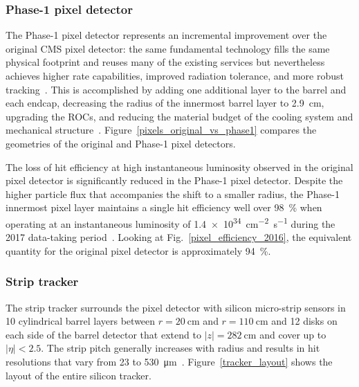 \subsubsection{Phase-1 pixel detector}
The Phase-1 pixel detector represents an incremental improvement over the original CMS pixel detector: the same fundamental technology fills the same physical footprint and reuses many of the existing services but nevertheless achieves higher rate capabilities, improved radiation tolerance, and more robust tracking~\cite{cms_phase1_pixels}. This is accomplished by adding one additional layer to the barrel and each endcap, decreasing the radius of the innermost barrel layer to \SI{2.9}{\cm}, upgrading the ROCs, and reducing the material budget of the cooling system and mechanical structure~\cite{cms_phase1_pixels, cms_phase1_pixel_tdr}. Figure~\ref{pixels_original_vs_phase1} compares the geometries of the original and Phase-1 pixel detectors.



The loss of hit efficiency at high instantaneous luminosity observed in the original pixel detector is significantly reduced in the Phase-1 pixel detector. Despite the higher particle flux that accompanies the shift to a smaller radius, the Phase-1 innermost pixel layer maintains a single hit efficiency well over \SI{98}{\percent} when operating at an instantaneous luminosity of \SI{1.4e34}{\cm\tothe{-2}\s\tothe{-1}} during the 2017 data-taking period~\cite{phase1_pixel_performance}. Looking at Fig.~\ref{pixel_efficiency_2016}, the equivalent quantity for the original pixel detector is approximately \SI{94}{\percent}.

\subsubsection{Strip tracker}
The strip tracker surrounds the pixel detector with silicon micro-strip sensors in 10 cylindrical barrel layers between $r=\SI{20}{\cm}$ and $r=\SI{110}{\cm}$ and 12 disks on each side of the barrel detector that extend to $|z|=\SI{282}{\cm}$ and cover up to $|\eta|<2.5$. The strip pitch generally increases with radius and results in hit resolutions that vary from \num{23} to \SI{530}{\um}~\cite{cms_experiment}. Figure~\ref{tracker_layout} shows the layout of the entire silicon tracker.

